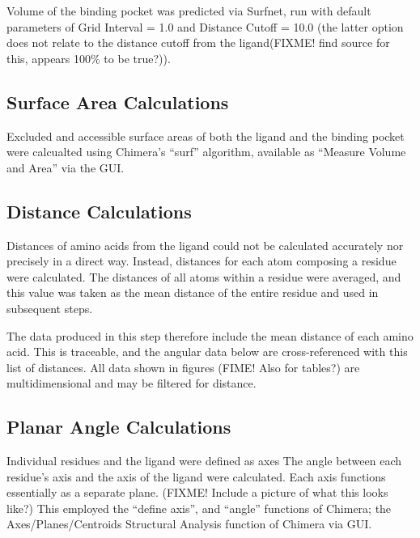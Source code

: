\documentclass[a4paper, nobind]{templates/ociamthesis}
\begin{document}
Volume of the binding pocket was predicted via Surfnet, run with default parameters of Grid Interval = 1.0 and Distance Cutoff = 10.0 (the latter option does not relate to the distance cutoff from the ligand(FIXME! find source for this, appears 100\% to be true?)).

\hypertarget{surface-area-calculations}{%
\subsection{Surface Area Calculations}\label{surface-area-calculations}}

Excluded and accessible surface areas of both the ligand and the binding pocket were calcualted using Chimera's ``surf'' algorithm, available as ``Measure Volume and Area'' via the GUI.

\hypertarget{distance-calculations}{%
\subsection{Distance Calculations}\label{distance-calculations}}

Distances of amino acids from the ligand could not be calculated accurately nor precisely in a direct way. Instead, distances for each atom composing a residue were calculated. The distances of all atoms within a residue were averaged, and this value was taken as the mean distance of the entire residue and used in subsequent steps.

The data produced in this step therefore include the mean distance of each amino acid. This is traceable, and the angular data below are cross-referenced with this list of distances. All data shown in figures (FIME! Also for tables?) are multidimensional and may be filtered for distance.

\hypertarget{planar-angle-calculations}{%
\subsection{Planar Angle Calculations}\label{planar-angle-calculations}}

Individual residues and the ligand were defined as axes The angle between each residue's axis and the axis of the ligand were calculated. Each axis functions essentially as a separate plane. (FIXME! Include a picture of what this looks like?) This employed the ``define axis'', and ``angle'' functions of Chimera; the Axes/Planes/Centroids Structural Analysis function of Chimera via GUI.
\end{document}
